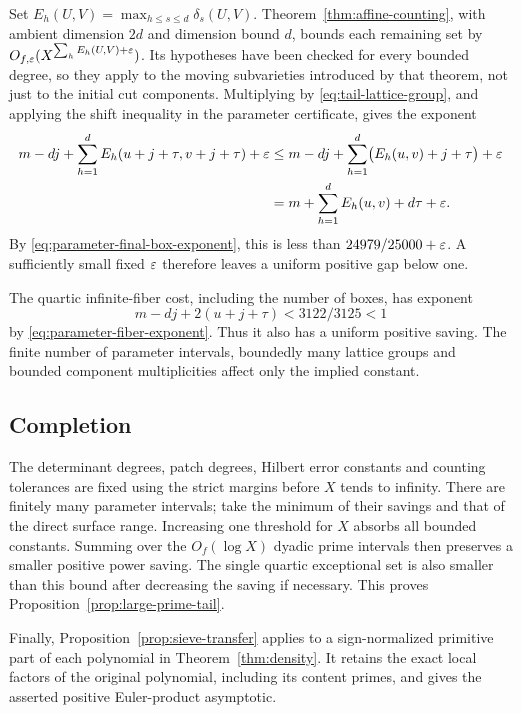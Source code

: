 Set $E_h(U,V)=\max_{h\le s\le d}\delta_s(U,V)$.
Theorem~\ref{thm:affine-counting}, with ambient dimension $2d$
and dimension bound $d$, bounds each remaining set by
$O_{f,\varepsilon}(X^{\sum_hE_h(U,V)+\varepsilon})$.
Its hypotheses have been checked for every bounded degree, so
they apply to the moving subvarieties introduced by that theorem,
not just to the initial cut components. Multiplying by
\eqref{eq:tail-lattice-group}, and applying the shift inequality
in the parameter certificate, gives the exponent
\begin{align*}
 m-dj+\sum_{h=1}^d E_h(u+j+\tau,v+j+\tau)+\varepsilon
 &\le m-dj+\sum_{h=1}^d\bigl(E_h(u,v)+j+\tau\bigr)+\varepsilon\\
 &=m+\sum_{h=1}^dE_h(u,v)+d\tau+\varepsilon.
\end{align*}
By \eqref{eq:parameter-final-box-exponent}, this is less than
$24979/25000+\varepsilon$. A sufficiently small fixed $\varepsilon$ therefore
leaves a uniform positive gap below one.

The quartic infinite-fiber cost, including the number of boxes, has
exponent
\[
 m-dj+2(u+j+\tau)<3122/3125<1
\]
by \eqref{eq:parameter-fiber-exponent}. Thus it also has a uniform
positive saving. The finite number of
parameter intervals, boundedly many lattice groups and bounded
component multiplicities affect only the implied constant.

\subsection{Completion}

The determinant degrees, patch degrees, Hilbert error constants
and counting tolerances are fixed using the strict margins before
$X$ tends to infinity. There are finitely many parameter intervals;
take the minimum of their savings and that of the direct surface
range. Increasing one threshold for $X$ absorbs all bounded
constants. Summing over the $O_f(\log X)$ dyadic prime intervals
then preserves a smaller positive power saving. The single
quartic exceptional set is also smaller than this bound after
decreasing the saving if necessary. This proves
Proposition~\ref{prop:large-prime-tail}.

Finally, Proposition~\ref{prop:sieve-transfer} applies to a
sign-normalized primitive part of each polynomial in
Theorem~\ref{thm:density}. It retains the exact local factors of
the original polynomial, including its content primes, and gives
the asserted positive Euler-product asymptotic.
